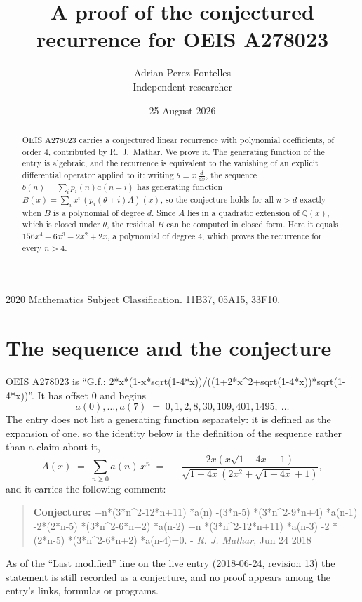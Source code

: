 \documentclass[11pt,a4paper]{article}
\title{A proof of the conjectured recurrence for OEIS A278023}
\author{Adrian Perez Fontelles\\ \small Independent researcher}
\date{25 August 2026}
\theoremstyle{plain}
\theoremstyle{definition}
\begin{document}
\maketitle

\begin{abstract}
OEIS A278023 carries a conjectured linear recurrence with polynomial coefficients, of
order 4, contributed by R.~J.~Mathar. We prove it. The generating function of the
entry is algebraic, and the recurrence is equivalent to the vanishing of an explicit
differential operator applied to it: writing $\theta=x\,\frac{d}{dx}$, the sequence
$b(n)=\sum_{i}p_{i}(n)a(n-i)$ has generating function
$B(x)=\sum_{i}x^{i}\,(p_{i}(\theta+i)A)(x)$, so the conjecture holds for all $n>d$ exactly
when $B$ is a polynomial of degree $d$. Since $A$ lies in a quadratic extension of
$\mathbb{Q}(x)$, which is closed under $\theta$, the residual $B$ can be computed in
closed form. Here it equals $156 x^{4} - 6 x^{3} - 2 x^{2} + 2 x$, a polynomial of degree $4$, which proves
the recurrence for every $n>4$.
\end{abstract}

\noindent\small 2020 Mathematics Subject Classification. 11B37, 05A15, 33F10.\normalsize

\section{The sequence and the conjecture}

OEIS A278023 is ``G.f.: 2*x*(1-x*sqrt(1-4*x))/((1+2*x\^{}2+sqrt(1-4*x))*sqrt(1-4*x))''. It has offset $0$ and begins
\[
a(0),\dots,a(7)\;=\;0, 1, 2, 8, 30, 109, 401, 1495,\ \dots
\]
The entry does not list a generating function separately: it is defined as the
expansion of one, so the identity below is the definition of the sequence rather than a
claim about it,
\begin{equation}\label{eq:gf}
A(x)\;=\;\sum_{n\ge 0} a(n)\,x^{n}\;=\;- \frac{2 x \left(x \sqrt{1 - 4 x} - 1\right)}{\sqrt{1 - 4 x} \left(2 x^{2} + \sqrt{1 - 4 x} + 1\right)} ,
\end{equation}
and it carries the following comment:
\begin{quote}\small
\textbf{Conjecture:} +n*(3*n\^{}2-12*n+11) *a(n) -(3*n-5) *(3*n\^{}2-9*n+4) *a(n-1) -2*(2*n-5) *(3*n\^{}2-6*n+2) *a(n-2) +n *(3*n\^{}2-12*n+11) *a(n-3) -2 *(2*n-5) *(3*n\^{}2-6*n+2) *a(n-4)=0. - \emph{R. J. Mathar}, Jun 24 2018
\end{quote}
As of the ``Last modified'' line on the live entry (2018-06-24, revision 13) the
statement is still recorded as a conjecture, and no proof appears among the entry's links,
formulas or programs.
\end{document}
